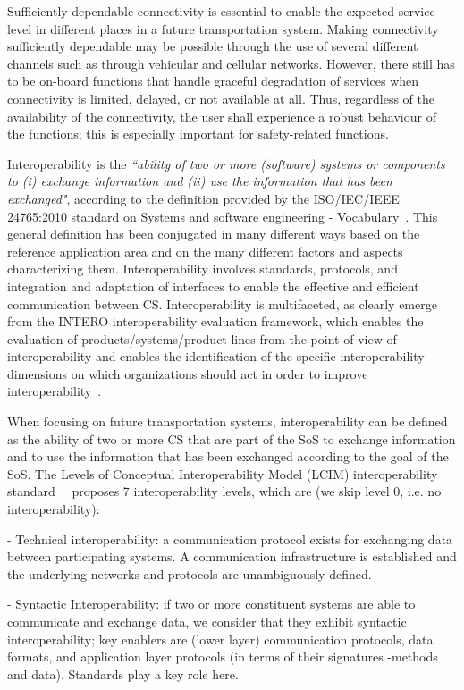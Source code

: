 Sufficiently dependable connectivity is essential to enable the expected service level in different places in a future transportation system. Making connectivity sufficiently dependable may be possible through the use of several different channels such as through vehicular and cellular networks. However, there still has to be on-board functions that handle graceful degradation of services when connectivity is limited, delayed, or not available at all. Thus, regardless of the availability of the connectivity, the user shall experience a robust behaviour of the functions; this is especially important for safety-related functions. 

Interoperability is the \textit{``ability of two or more (software) systems or components to (i) exchange information and (ii) use the information that has been exchanged"}, according to the definition provided by the ISO/IEC/IEEE 24765:2010 standard on Systems and software engineering - Vocabulary~\cite{STANDARD}. 
This general definition has been conjugated in many different ways based on the reference application area and on the many different factors and aspects characterizing them. Interoperability involves standards, protocols, and integration and adaptation of interfaces to enable the effective and efficient communication between CS. Interoperability is  multifaceted, as clearly emerge from the INTERO interoperability evaluation framework, which enables the evaluation of products/systems/product lines from the point of view of interoperability and enables the identification of the specific
interoperability dimensions on which organizations should act in order to improve interoperability~\cite{intero}.

When focusing on future transportation systems, interoperability can be defined as the ability of two or more CS that are part of the SoS to exchange information and to use the information that has been exchanged according to the goal of the SoS. The Levels of Conceptual Interoperability Model (LCIM) interoperability standard~~\cite{Wang2009,Tolk2006} proposes 7 interoperability levels, which are (we skip level 0,
i.e. no interoperability):

 - Technical interoperability: a communication protocol exists for exchanging data between participating systems. A communication infrastructure is established and the underlying networks and protocols are unambiguously defined.

 - Syntactic Interoperability: if two or more constituent systems are able to communicate and exchange data, we consider that they exhibit syntactic interoperability; key enablers are (lower layer) communication protocols, data formats, and application layer protocols (in terms of their signatures -methods and data). Standards play a key role here.

